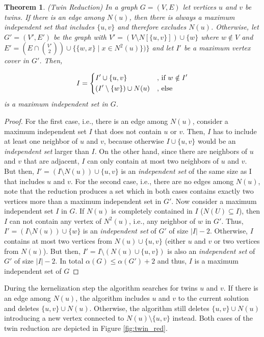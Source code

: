 \documentclass[12pt,a4paper,twoside]{scrartcl}
\newtheorem{theorem}{Theorem}
\numberwithin{equation}{section}
\begin{document}
\begin{theorem} (Twin Reduction) In a graph $G=(V,E)$ let vertices $u$ and $v$ be twins. If there is an edge among $N(u)$, then there is always a maximum independent set that includes $\{u,v\}$ and therefore excludes $N(u)$. Otherwise, let $G'=(V',E')$ be the graph with $V'=(V\setminus N[\{u,v\}])\cup\{w\}$ where $w\notin V$ and $E'=(E\cap\binom{V'}{2})\cup \{\{w,x\}\;|\;x\in N^2(u)\})\}$ and let $I'$ be a \textit{maximum vertex cover} in $G'$. Then, 
	
	\[I=\begin{dcases}
	I'\cup \{u,v\} & \text{, if }w\notin I'\\
	(I'\setminus \{w\})\cup N(u) & \text{, else} %
	\end{dcases}\]
	is a maximum independent set in $G$.
\end{theorem}
\begin{proof}
	For the first case, i.e., there is an edge among $N(u)$, consider a maximum independent set $I$ that does not contain $u$ or $v$. Then, $I$ has to include at least one neighbor of $u$ and $v$, because otherwise $I\cup \{u,v\}$ would be an \textit{independent set} larger than $I$. On the other hand, since there are neighbors of $u$ and $v$ that are adjacent, $I$ can only contain at most two neighbors of $u$ and $v$. But then, $I' = (I\setminus N(u))\cup\{u,v\}$ is an \textit{independent set} of the same size as I that includes $u$ and $v$. For the second case, i.e., there are no edges among $N(u)$, note that the reduction produces a set which in both cases contains exactly two vertices more than a maximum independent set in $G'$. Now consider a maximum independent set $I$ in $G$. If $N(u)$ is completely contained in $I$ ($N(U)\subseteq I$), then $I$ can not contain any vertex of $N^2(u)$, i.e., any neighbor of $w$ in $G'$. Thus, $I' = (I\setminus N(u))\cup\{w\}$ is an \textit{independent set} of $G'$ of size $|I| - 2$. Otherwise, $I$ contains at most two vertices from $N(u)\cup\{u,v\}$ (either $u$ and $v$ or two vertices from $N(u)$). But then, $I' = I\setminus(N(u)\cup\{u,v\})$ is also an \textit{independent set} of $G'$ of size $|I|-2$. In total $\alpha(G) \leq \alpha(G')+2$ and thus, $I$ is a maximum independent set of $G$
\end{proof}

During the kernelization step the algorithm searches for twins $u$ and $v$. If there is an edge among $N(u)$, the algorithm includes $u$ and $v$ to the current solution and deletes $\{u,v\}\cup N(u)$. Otherwise, the algorithm still deletes $\{u,v\}\cup N(u)$ introducing a new vertex connected to $N(u)\setminus\{u,v\}$ instead. Both cases of the twin reduction are depicted in Figure \ref{fig:twin_red}.\\
\end{document}
